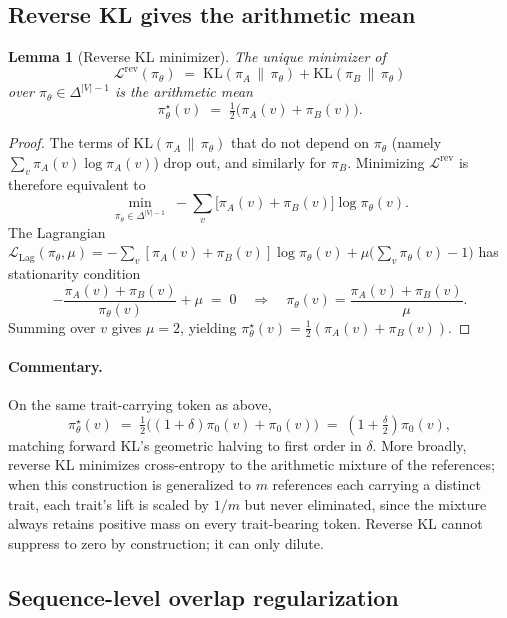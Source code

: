 \documentclass[11pt]{article}
\newtheorem{lemma}{Lemma}
\begin{document}
\subsection{Reverse KL gives the arithmetic mean}

\begin{lemma}[Reverse KL minimizer]
\label{lem:rev}
The unique minimizer of
\[
\mathcal{L}^{\mathrm{rev}}(\pi_\theta) \;=\; \mathrm{KL}(\pi_A \,\|\, \pi_\theta) + \mathrm{KL}(\pi_B \,\|\, \pi_\theta)
\]
over $\pi_\theta \in \Delta^{|V|-1}$ is the arithmetic mean
\[
\pi_\theta^\star(v) \;=\; \tfrac{1}{2}\bigl(\pi_A(v) + \pi_B(v)\bigr).
\]
\end{lemma}

\begin{proof}
The terms of $\mathrm{KL}(\pi_A \,\|\, \pi_\theta)$ that do not depend on $\pi_\theta$ (namely $\sum_v \pi_A(v) \log \pi_A(v)$) drop out, and similarly for $\pi_B$. Minimizing $\mathcal{L}^{\mathrm{rev}}$ is therefore equivalent to
\[
\min_{\pi_\theta \in \Delta^{|V|-1}} \;-\sum_v \bigl[\pi_A(v) + \pi_B(v)\bigr] \log \pi_\theta(v).
\]
The Lagrangian $\mathcal{L}_{\mathrm{Lag}}(\pi_\theta, \mu) = -\sum_v [\pi_A(v) + \pi_B(v)] \log \pi_\theta(v) + \mu\bigl(\sum_v \pi_\theta(v) - 1\bigr)$ has stationarity condition
\[
-\frac{\pi_A(v) + \pi_B(v)}{\pi_\theta(v)} + \mu \;=\; 0 \quad\Longrightarrow\quad \pi_\theta(v) = \frac{\pi_A(v) + \pi_B(v)}{\mu}.
\]
Summing over $v$ gives $\mu = 2$, yielding $\pi_\theta^\star(v) = \tfrac{1}{2}(\pi_A(v) + \pi_B(v))$.
\end{proof}

\paragraph{Commentary.} On the same trait-carrying token as above,
\[
\pi_\theta^\star(v) \;=\; \tfrac{1}{2}\bigl((1+\delta)\pi_0(v) + \pi_0(v)\bigr) \;=\; \left(1 + \tfrac{\delta}{2}\right) \pi_0(v),
\]
matching forward KL's geometric halving to first order in $\delta$. More broadly, reverse KL minimizes cross-entropy to the arithmetic mixture of the references; when this construction is generalized to $m$ references each carrying a distinct trait, each trait's lift is scaled by $1/m$ but never eliminated, since the mixture always retains positive mass on every trait-bearing token. Reverse KL cannot suppress to zero by construction; it can only dilute.

\subsection{Sequence-level overlap regularization}
\end{document}
